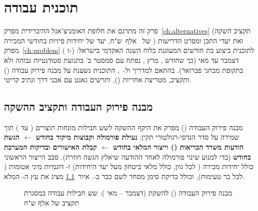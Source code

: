 \chapter{תוכנית עבודה}
\label{ch:workplan}

פרק זה מתרגם את חלופת האומניצ'אנל ההיברידית מפרק~\ref{ch:alternatives} (תקציב
השקה של ~אלף~ש"ח, יעד של  יחידות פיזיות בחודשי המכירה
) ואת יעדי התכן ומפרט הדרישות מפרק~\ref{ch:problem} (
ו-) לתוכנית ביצוע בת  חודשים המעוגנת בלוח השנה
האקדמי בישראל: דצמבר  עד מאי  (כך שחודש , מרץ
, נפתח עם סמסטר ב' בתנועת סטודנטיות גבוהה ולא בתקופת מבחני פברואר).
בהתאם למדריך  ול-~\cite{pmi2021pmbok,kerzner2022project},
התוכנית נשענת על מבנה פירוק עבודה () ותקציב, מטריצת אחריות (),
ותרשים גאנט עם אבני דרך ונתיב קריטי.

\section{מבנה פירוק העבודה ותקציב ההשקה}
\label{sec:workplan-wbs}

מבנה פירוק העבודה () מפרק את היקף ההשקה לשש חבילות מונחות תוצרים
( עד ) תוך שמירה על סדר הנדסי-רגולטורי תקין: \textbf{נעילת
פורמולה וקבוצות מיקוד בחודש  $\leftarrow$ הגשת הודעות משרד הבריאות
() וייצור המלאי בחודש  $\leftarrow$ קבלת האישורים ובדיקות
המערכת בחודש } (כדי למנוע שינוי פורמולה לאחר ההודעה שיאלץ הגשה חוזרת).
סבב הייצור הראשוני כולל  יחידות מכירה ( לכל גוון, כולל
מלאי ביטחון מעל יעד  היחידות) ו- דוגמיות מיני אטומות
( לכל בר טעימות), וכולל בדיקת סימן מסחר לשם  כבר ב-.
איור~\ref{fig:wbs-tree} מציג את עץ ה- המלא.

\begin{figure}[htb]
  \begin{diagram}
    
  \end{diagram}
  \caption[מבנה פירוק העבודה () להשקת ]{מבנה פירוק העבודה () להשקת  (דצמבר  -- מאי
    ): שש חבילות עבודה במסגרת תקציב של  אלף ש"ח}
  \label{fig:wbs-tree}
\end{figure}

